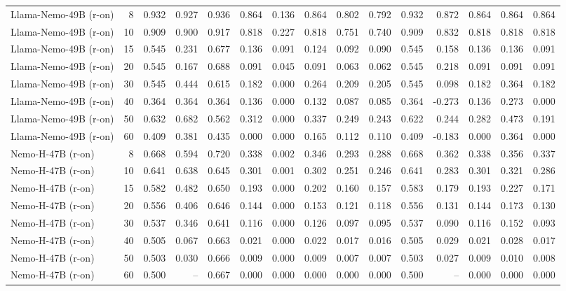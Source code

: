 \documentclass[acmsmall,screen,review,anonymous]{acmart}
\begin{document}
\begin{landscape}
\begin{longtable}{p{4.1cm}r*{13}{r}}
Llama-Nemo-49B (r-on) & 8 & 0.932 & 0.927 & 0.936 & 0.864 & 0.136 & 0.864 & 0.802 & 0.792 & 0.932 & 0.872 & 0.864 & 0.864 & 0.864 \\
Llama-Nemo-49B (r-on) & 10 & 0.909 & 0.900 & 0.917 & 0.818 & 0.227 & 0.818 & 0.751 & 0.740 & 0.909 & 0.832 & 0.818 & 0.818 & 0.818 \\
Llama-Nemo-49B (r-on) & 15 & 0.545 & 0.231 & 0.677 & 0.136 & 0.091 & 0.124 & 0.092 & 0.090 & 0.545 & 0.158 & 0.136 & 0.136 & 0.091 \\
Llama-Nemo-49B (r-on) & 20 & 0.545 & 0.167 & 0.688 & 0.091 & 0.045 & 0.091 & 0.063 & 0.062 & 0.545 & 0.218 & 0.091 & 0.091 & 0.091 \\
Llama-Nemo-49B (r-on) & 30 & 0.545 & 0.444 & 0.615 & 0.182 & 0.000 & 0.264 & 0.209 & 0.205 & 0.545 & 0.098 & 0.182 & 0.364 & 0.182 \\
Llama-Nemo-49B (r-on) & 40 & 0.364 & 0.364 & 0.364 & 0.136 & 0.000 & 0.132 & 0.087 & 0.085 & 0.364 & -0.273 & 0.136 & 0.273 & 0.000 \\
Llama-Nemo-49B (r-on) & 50 & 0.632 & 0.682 & 0.562 & 0.312 & 0.000 & 0.337 & 0.249 & 0.243 & 0.622 & 0.244 & 0.282 & 0.473 & 0.191 \\
Llama-Nemo-49B (r-on) & 60 & 0.409 & 0.381 & 0.435 & 0.000 & 0.000 & 0.165 & 0.112 & 0.110 & 0.409 & -0.183 & 0.000 & 0.364 & 0.000 \\
Nemo-H-47B (r-on) & 8 & 0.668 & 0.594 & 0.720 & 0.338 & 0.002 & 0.346 & 0.293 & 0.288 & 0.668 & 0.362 & 0.338 & 0.356 & 0.337 \\
Nemo-H-47B (r-on) & 10 & 0.641 & 0.638 & 0.645 & 0.301 & 0.001 & 0.302 & 0.251 & 0.246 & 0.641 & 0.283 & 0.301 & 0.321 & 0.286 \\
Nemo-H-47B (r-on) & 15 & 0.582 & 0.482 & 0.650 & 0.193 & 0.000 & 0.202 & 0.160 & 0.157 & 0.583 & 0.179 & 0.193 & 0.227 & 0.171 \\
Nemo-H-47B (r-on) & 20 & 0.556 & 0.406 & 0.646 & 0.144 & 0.000 & 0.153 & 0.121 & 0.118 & 0.556 & 0.131 & 0.144 & 0.173 & 0.130 \\
Nemo-H-47B (r-on) & 30 & 0.537 & 0.346 & 0.641 & 0.116 & 0.000 & 0.126 & 0.097 & 0.095 & 0.537 & 0.090 & 0.116 & 0.152 & 0.093 \\
Nemo-H-47B (r-on) & 40 & 0.505 & 0.067 & 0.663 & 0.021 & 0.000 & 0.022 & 0.017 & 0.016 & 0.505 & 0.029 & 0.021 & 0.028 & 0.017 \\
Nemo-H-47B (r-on) & 50 & 0.503 & 0.030 & 0.666 & 0.009 & 0.000 & 0.009 & 0.007 & 0.007 & 0.503 & 0.027 & 0.009 & 0.010 & 0.008 \\
Nemo-H-47B (r-on) & 60 & 0.500 & -- & 0.667 & 0.000 & 0.000 & 0.000 & 0.000 & 0.000 & 0.500 & -- & 0.000 & 0.000 & 0.000 \\

\end{longtable}
\end{landscape}
\end{document}
